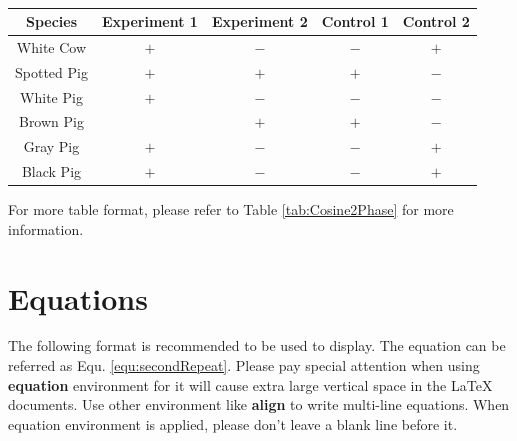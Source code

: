 \renewcommand{\thetable}{\arabic{chapter}.\arabic{table} Continued.}
\addtocounter{table}{-1}
\begin{table}[h]
	\captionsetup{list=off}	%
	\begin{center}
	\caption{}
	\label{tab:exampleB}
	\begin{tabular}{||c|c|c|c|c||}		
		\hline
		Species  	&  	Experiment 1	&  Experiment 2  	&  	Control 1 	& 	Control 2	\\	\hline
		White Cow   	&  	$+$		&  	$-$		&	$-$		&	$+$		\\	\hline
		Spotted Pig	&	$+$		&	$+$		&	$+$		&	$-$		\\	\hline
		White Pig	&	$+$		&	$-$		&	$-$		&	$-$		\\	\hline
		Brown Pig	&			&	$+$		&	$+$		&	$-$		\\	\hline
		Gray Pig	&	$+$		&	$-$		&	$-$		&	$+$		\\	\hline
		Black Pig	&	$+$		&	$-$		&	$-$		&	$+$		\\	\hline
	\end{tabular}
	\end{center}
\end{table}
\renewcommand{\thetable}{\arabic{chapter}.\arabic{table}}

For more table format, please refer to Table \ref{tab:Cosine2Phase} for more information.
\section{Equations}
The following format is recommended to be used to display. The equation can be referred as Equ. \eqref{equ:secondRepeat}. Please pay special attention when using \textbf{equation} environment for it will cause extra large vertical space in the \LaTeX ~ documents. Use other environment like \textbf{align} to write multi-line equations. When equation environment is applied, please don't leave a blank line before it. 

